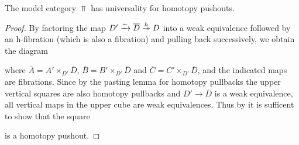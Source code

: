 \begin{prop}\label{lem:topUniversalPo}
    The model category $\Top$ has universality for homotopy pushouts.
    \begin{proof}
        By factoring the map $D'\xrightarrow{\sim}\overline{D}\xtwoheadrightarrow{h} D$ into a weak equivalence followed by an h-fibration (which is also a fibration) and pulling back successively, we obtain the diagram %
        \begin{center}
        \end{center}
        where $\overline{A}=A'\times_{D'}\overline{D}$, $\overline{B}=B'\times_{D'}\overline{D}$ and $\overline{C}=C'\times_{D'}\overline{D}$, and the indicated maps are fibrations.
        Since by the pasting lemma for homotopy pullbacks the upper vertical squares are also homotopy pullbacks and $D'\to\overline{D}$ is a weak equivalence, all vertical maps in the upper cube are weak equivalences.
        Thus by %
        it is sufficent to show that the square
        \begin{center}
        \end{center}
        is a homotopy pushout.


\end{proof}
\end{prop}
